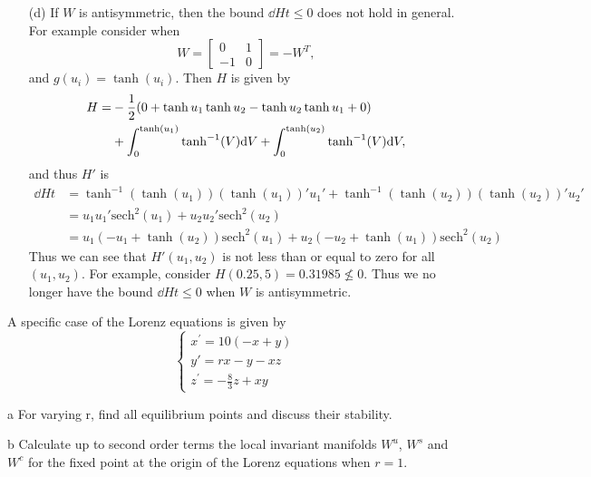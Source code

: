 \documentclass[12pt]{report}
\begin{document}
\begin{solution}
\begin{itemize}
        \item[(d)]
        If $W$ is antisymmetric, then the bound $\dd{H}{t} \leq 0$ does not hold in general. For example consider when 
        \[ 
            W = \begin{bmatrix}
                0 & 1\\ -1 & 0
            \end{bmatrix} = - W^T,
        \]
        and $g(u_i) = \tanh(u_i)$. Then $H$ is given by
        \begin{align*}
            H =& -\frac{1}{2} {\left(0 + \tanh{u_1}\tanh{u_2} -\tanh{u_2}\tanh{u_1} + 0\right)}\\ &+ \int_0^{\tanh(u_1)}\tanh^{-1}(V)\mathrm{d}V + \int_0^{\tanh(u_2)}\tanh^{-1}(V)\mathrm{d}V,
        \end{align*} 
        and thus $H'$ is
        \begin{align*}
            \dd{H}{t} &= \tanh^{-1}(\tanh(u_1))(\tanh(u_1))'u_1' + \tanh^{-1}(\tanh(u_2))(\tanh(u_2))'u_2'\\
            &= u_1u_1'\text{sech}^2(u_1) + u_2u_2'\text{sech}^2(u_2)\\
            &= u_1(-u_1 + \tanh(u_2))\text{sech}^2(u_1) + u_2(-u_2 + \tanh(u_1))\text{sech}^2(u_2)
        \end{align*} 
        Thus we can see that $H'(u_1,u_2)$ is not less than or equal to zero for all $(u_1,u_2)$. For example, consider $H(0.25,5) = 0.31985 \not\leq 0$. Thus we no longer have the bound $\dd{H}{t} \leq 0$ when $W$ is antisymmetric.  

    \end{itemize}
\end{solution}

\newpage



\begin{problem}
    A specific case of the Lorenz equations is given by
    \begin{equation}
    \left\{\begin{array}{l}
    x^{\prime}=10(-x+y) \\
    y'=r x-y-x z \\
    z^{\prime}=-\frac{8}{3} z+x y
    \end{array}\right.
    \end{equation}
    \item [a] For varying r, find all equilibrium points and discuss
    their stability.
    \item [b] Calculate up to second order terms the local invariant manifolds $W^u$, $W^s$ and $W^c$
    for the fixed point at the origin of the Lorenz equations when $r=1$.
\end{problem}
\end{document}

